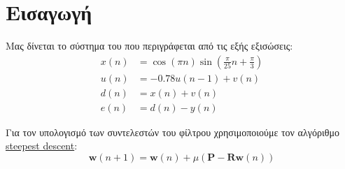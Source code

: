 \newcommand{\weiner}[1]{\mathbf{w}\left(#1\right)}
\newcommand{\Rmatrix}{\mathbf{R}}
\newcommand{\Pvector}{\mathbf{P}}
\section{Εισαγωγή}
Μας δίνεται το σύστημα του 
που περιγράφεται από τις εξής εξισώσεις:
\begin{align}
x(n) &= \cos{(\pi n)} \sin{(\frac{\pi}{25} n + \frac{\pi}{3})}\label{eq:x}\\
u(n) &= -0.78 u(n-1) + v(n)\label{eq:u}\\
d(n) &= x(n) + v(n)\label{eq:x+v}\\
e(n) &= d(n) - y(n)\label{eq:d-y}
\end{align}

Για τον υπολογισμό των συντελεστών του φίλτρου χρησιμοποιούμε τον αλγόριθμο
\href{https://en.wikipedia.org/wiki/Steepest_descent}{steepest descent}:
\begin{equation}\label{eq:weiner}
\weiner{n+1} = \weiner{n} + \mu\left(\Pvector{} - \Rmatrix{} \weiner{n}\right)
\end{equation}
